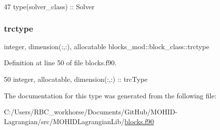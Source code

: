 \begin{DoxyCode}
47         \textcolor{keywordtype}{type}(solver\_class)     :: Solver
\end{DoxyCode}
\mbox{\label{structblocks__mod_1_1block__class_a3ad957b5a86ff6c774dc76521bf5126e}} 
\subsubsection{\texorpdfstring{trctype}{trctype}}
{\footnotesize\ttfamily integer, dimension(\+:,\+:), allocatable blocks\+\_\+mod\+::block\+\_\+class\+::trctype\hspace{0.3cm}{\ttfamily [private]}}



Definition at line 50 of file blocks.\+f90.


\begin{DoxyCode}
50         \textcolor{keywordtype}{integer}, \textcolor{keywordtype}{allocatable}, \textcolor{keywordtype}{dimension(:,:)} :: trcType
\end{DoxyCode}


The documentation for this type was generated from the following file\+:\begin{DoxyCompactItemize}
\item 
C\+:/\+Users/\+R\+B\+C\+\_\+workhorse/\+Documents/\+Git\+Hub/\+M\+O\+H\+I\+D-\/\+Lagrangian/src/\+M\+O\+H\+I\+D\+Lagrangian\+Lib/\mbox{\hyperlink{blocks_8f90}{blocks.\+f90}}\end{DoxyCompactItemize}

